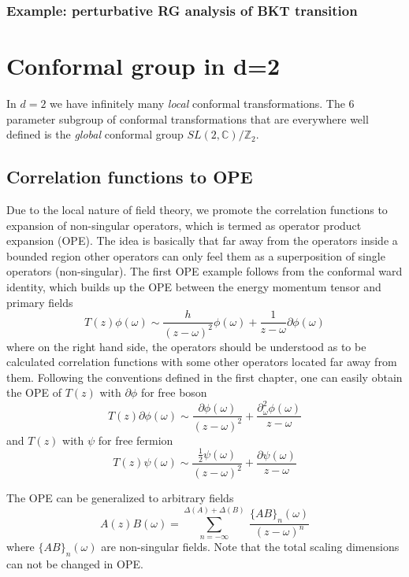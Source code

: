 \documentclass[submission, PhysLectNotes]{SciPost}
\begin{document}
\subsubsection{Example: perturbative RG analysis of BKT transition}

\section{Conformal group in d=2}

In $d=2$ we have infinitely many \emph{local} conformal transformations. The 6 parameter subgroup of conformal transformations that are everywhere well defined is the \emph{global} conformal group $SL(2,\mathbb{C})/\mathbb{Z}_2$.

\subsection{Correlation functions to OPE}
Due to the local nature of field theory, we promote the correlation functions to expansion of non-singular operators, which is termed as operator product expansion (OPE). The idea is basically that far away from the operators inside a bounded region other operators can only feel them as a superposition of single operators (non-singular). The first OPE example follows from the conformal ward identity, which builds up the OPE between the energy momentum tensor and primary fields
\begin{equation}
	T(z) \phi(\omega) \sim \frac{h}{\left(z-\omega\right)^2} \phi(\omega) + \frac{1}{z-\omega} \partial \phi(\omega)
\end{equation}
where on the right hand side, the operators should be understood as to be calculated correlation functions with some other operators located far away from them.  Following the conventions defined in the first chapter, one can easily obtain the OPE of $T(z)$ with $\partial \phi$ for free boson
\begin{equation}
T(z) \partial\phi(\omega) \sim \frac{\partial \phi(\omega)}{\left(z-\omega\right)^2} + \frac{\partial_\omega^2 \phi(\omega)}{z-\omega}
\end{equation}
and $T(z)$ with $\psi$ for free fermion 
\begin{equation}
T(z) \psi(\omega) \sim \frac{\frac{1}{2} \psi(\omega)}{\left(z-\omega\right)^2} + \frac{\partial \psi(\omega)}{z-\omega}
\end{equation}

The OPE can be generalized to arbitrary fields
\begin{equation}
A(z) B(\omega) = \sum_{n=-\infty}^{\Delta(A) + \Delta(B)}\  \frac{\{AB\}_n(\omega)}{\left(z-\omega\right)^n}
\end{equation}
where $\{AB\}_n(\omega)$ are non-singular fields. Note that the total scaling dimensions can not be changed in OPE.
\end{document}
